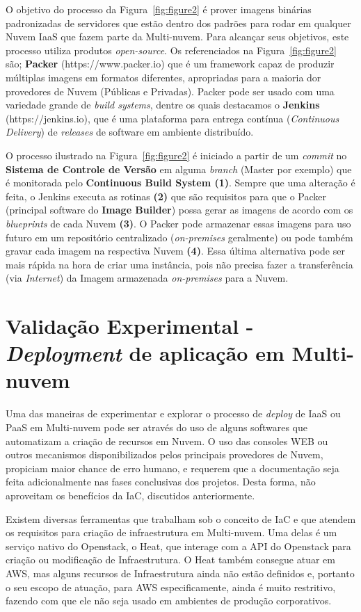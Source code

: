 \documentclass[12pt]{article}
\begin{document}
	O objetivo do processo da Figura~\ref{fig:figure2} é prover imagens binárias padronizadas de servidores que estão dentro dos padrões para rodar em qualquer Nuvem IaaS que fazem parte da Multi-nuvem. Para alcançar seus objetivos, este processo utiliza produtos \textit{open-source}. Os referenciados na Figura~\ref{fig:figure2} são; \textbf{Packer} (https://www.packer.io) que é um framework capaz de produzir múltiplas imagens em formatos diferentes, apropriadas para a maioria dor provedores de Nuvem (Públicas e Privadas). Packer pode ser usado com uma variedade grande de \textit{build systems}, dentre os quais destacamos o \textbf{Jenkins} (https://jenkins.io), que é uma plataforma para entrega contínua (\textit{Continuous Delivery}) de \textit{releases} de software em ambiente distribuído.

	O processo ilustrado na Figura~\ref{fig:figure2} é iniciado a partir de um \textit{commit} no \textbf{Sistema de Controle de Versão} em alguma \textit{branch} (Master por exemplo) que é monitorada pelo \textbf{Continuous Build System (1)}. Sempre que uma alteração é feita, o Jenkins executa as rotinas \textbf{(2)} que são requisitos para que o Packer (principal software do \textbf{Image Builder}) possa gerar as imagens de acordo com os \textit{blueprints} de cada Nuvem \textbf{(3)}. O Packer pode armazenar essas imagens para uso futuro em um repositório centralizado (\textit{on-premises} geralmente) ou pode também gravar cada imagem na respectiva Nuvem \textbf{(4)}. Essa última alternativa pode ser mais rápida na hora de criar uma instância, pois não precisa fazer a transferência (via \textit{Internet}) da Imagem armazenada \textit{on-premises} para a Nuvem.
	
	\section{Validação Experimental - \textit{Deployment} de aplicação em Multi-nuvem}
	
	Uma das maneiras de experimentar e explorar o processo de \textit{deploy} de IaaS ou PaaS em Multi-nuvem pode ser através do uso de alguns softwares que automatizam a criação de recursos em Nuvem. O uso das consoles WEB ou outros mecanismos disponibilizados pelos principais provedores de Nuvem, propiciam maior chance de erro humano, e requerem que a documentação seja feita adicionalmente nas fases conclusivas dos projetos. Desta forma, não aproveitam os benefícios da IaC, discutidos anteriormente.
	
	Existem diversas ferramentas que trabalham sob o conceito de IaC e que atendem os requisitos para criação de infraestrutura em Multi-nuvem. Uma delas é um serviço nativo do Openstack, o Heat, que interage com a API do Openstack para criação ou modificação de Infraestrutura. O Heat também consegue atuar em AWS, mas alguns recursos de Infraestrutura ainda não estão definidos e, portanto o seu escopo de atuação, para AWS especificamente, ainda é muito restritivo, fazendo com que ele não seja usado em ambientes de produção corporativos. 
	
\end{document}
